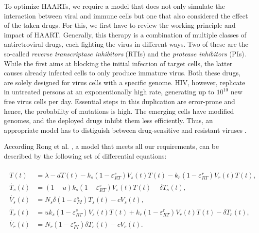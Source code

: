 To optimize HAARTs, we require a model that does not only simulate the interaction between viral and immune cells but 
one that also considered the effect of the taken drugs.\newline
For this, we first have to review the working principle and impact of HAART.
Generally, this therapy is a combination of multiple classes of antiretroviral drugs, each fighting the virus in different ways.
Two of these are the so-called \textit{reverse transcriptase inhibitors} (RTIs) and the \textit{protease inhibitors} (PIs).
While the first aims at blocking the initial infection of target cells, the latter causes already infected cells to only produce 
immature virus.
Both these drugs, are solely designed for virus cells with a specific genome.
HIV, however, replicate in untreated persons at an exponentionally high rate, generating up to $10^{10}$ new free virus 
cells per day. Essential steps in this duplication are error-prone and hence, the probability of mutations is high.
The emerging cells have modified genomes, and the deployed drugs inhibt them less efficiently.
Thus, an appropriate model has to distiguish between drug-sensitive and resistant viruses \cite{rong2007emergence}.\par
According Rong et al. \cite{rong2007emergence}, a model that meets all our requirements, can be described by the following set 
of differential equations:

\begin{align}
    \begin{split}
        \dot{T}(t) &= \lambda - dT(t) - k_s (1 - \varepsilon_{RT}^s) V_s(t) T(t) - k_r (1 - \varepsilon_{RT}^r) V_r(t) T(t),\\
        \dot{T_s}(t) &= (1-u)k_s(1 - \varepsilon_{RT}^s)V_s(t)T(t) - \delta T_s(t),\\
        \dot{V_s}(t) &= N_s \delta (1 - \varepsilon_{PI}^s) T_s(t) - c V_s(t),\\
        \dot{T_r}(t) &= u k_s (1 - \varepsilon_{RT}^s) V_s(t) T(t) + k_r (1 - \varepsilon_{RT}^r) V_r(t) T(t) - \delta T_r(t),\\
        \dot{V_r}(t) &= N_r (1 - \varepsilon_{PI}^r) \delta T_r(t) - c V_r(t).
    \end{split}
    \label{equ:HIVmodel}
\end{align}

